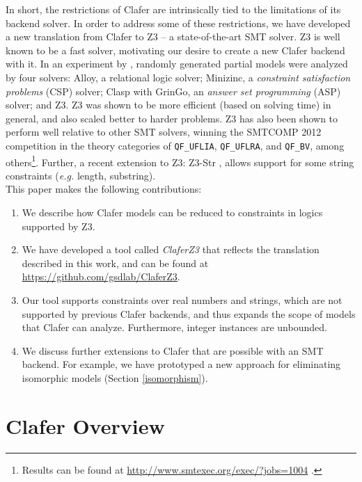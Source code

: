 \documentclass{easychair}
\newcommand{\eg}{\emph{e.g.}\xspace}
\begin{document}
\indent In short, the restrictions of Clafer are intrinsically tied to the limitations of its backend solver. In order to address some of these restrictions, we have developed a new translation from Clafer to Z3 \cite{Moura} -- a state-of-the-art SMT solver. Z3 is well known to be a fast solver, motivating our desire to create a new Clafer backend with it. In an experiment by \cite{Saadatpanah2012}, randomly generated partial models were analyzed by four solvers: Alloy, a relational logic solver; Minizinc, a  \textit{constraint satisfaction problems} (CSP) solver; Clasp with GrinGo, an \textit{answer set programming} (ASP) solver; and Z3. Z3 was shown to be more efficient (based on solving time) in general, and also scaled better to harder problems. Z3 has also been shown to perform well relative to other SMT solvers, winning the SMTCOMP 2012 competition in the theory categories of \texttt{QF\_UFLIA}, \texttt{QF\_UFLRA}, and \texttt{QF\_BV}, among others\footnote{Results can be found at \url{http://www.smtexec.org/exec/?jobs=1004} .}. Further, a recent extension to Z3: Z3-Str \cite{Zheng2013}, allows support for some string constraints (\eg length, substring).\\
\indent This paper makes the following contributions:
\begin{enumerate}[noitemsep]
\item We describe how Clafer models can be reduced to constraints in logics supported by Z3. 
\item We have developed a tool called \textit{ClaferZ3} that reflects the translation described in this work, and can be found at \url{https://github.com/gsdlab/ClaferZ3}.
\item Our tool supports constraints over real numbers and strings, which are not supported by previous Clafer backends, and thus expands the scope of models that Clafer can analyze. Furthermore, integer instances are unbounded.
\item We discuss further extensions to Clafer that are possible with an SMT backend. For example, we have prototyped a new approach for eliminating isomorphic models (Section \ref{isomorphism}).
\end{enumerate}

\section{Clafer Overview}
\label{claferoverview}
\end{document}
